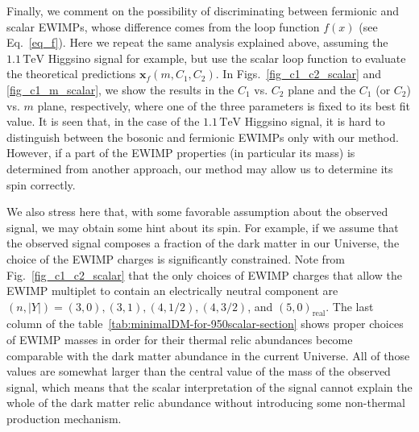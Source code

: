 \documentclass[12pt,twoside,book]{article}
\begin{document}
Finally, we comment on the possibility of discriminating between
fermionic and scalar EWIMPs, whose difference comes from the loop
function $f(x)$ (see Eq.~\eqref{eq_f}).  Here we repeat the same
analysis explained above, assuming the $1.1\,\mathrm{TeV}$ Higgsino
signal for example, but use the scalar loop function to evaluate the
theoretical predictions $\bm{x}_f (m, C_1, C_2)$.  In
Figs.~\ref{fig_c1_c2_scalar} and \ref{fig_c1_m_scalar}, we show the
results in the $C_1$ vs. $C_2$ plane and the $C_1$ (or $C_2$) vs. $m$
plane, respectively, where one of the three parameters is fixed to its
best fit value.  It is seen that, in the case of the
$1.1\,\mathrm{TeV}$ Higgsino signal, it is hard to distinguish between
the bosonic and fermionic EWIMPs only with our method.  However, if a
part of the EWIMP properties (in particular its mass) is determined
from another approach, our method may allow us to determine its spin
correctly.

We also stress here that, with some favorable assumption about the
observed signal, we may obtain some hint about its spin.  For example,
if we assume that the observed signal composes a fraction of the dark
matter in our Universe, the choice of the EWIMP charges is
significantly constrained.  Note from Fig.~\ref{fig_c1_c2_scalar} that
the only choices of EWIMP charges that allow the EWIMP multiplet to
contain an electrically neutral component are
$(n,|Y|)=(3,0),(3,1),(4,1/2),(4,3/2)$, and $(5,0)_\text{real}$.  The
last column of the table~\ref{tab:minimalDM-for-950scalar-section} shows proper choices of EWIMP masses in order
for their thermal relic abundances become comparable with the dark
matter abundance in the current Universe.  All of those values are
somewhat larger than the central value of the mass of the observed
signal, which means that the scalar interpretation of the signal
cannot explain the whole of the dark matter relic abundance without
introducing some non-thermal production mechanism.
\end{document}
